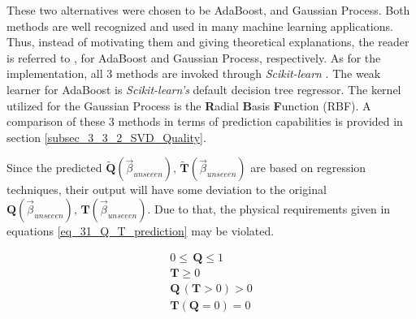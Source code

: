 These two alternatives were chosen to be AdaBoost, and Gaussian Process.
Both methods are well recognized and used in many machine learning applications.
Thus, instead of motivating them and giving theoretical explanations, the reader is referred to \cite{Adaboost}, \cite{Rasmussen2004,bishop2006pattern} for AdaBoost and Gaussian Process, respectively. 
As for the implementation, all 3 methods are invoked through \emph{Scikit-learn} \cite{scikit-learn}.
The weak learner for AdaBoost is  \emph{Scikit-learn's} default decision tree regressor.
The kernel utilized for the Gaussian Process is the \textbf{R}adial \textbf{B}asis \textbf{F}unction (RBF). A comparison of these 3 methods in terms of prediction capabilities is provided in section \ref{subsec_3_3_2_SVD_Quality}.\newline

Since the predicted $\bm{\tilde{Q}}(\vec{\beta}_{unseeen}) ,\, \bm{\tilde{T}}(\vec{\beta}_{unseeen})$ are based on regression techniques, their output will have some deviation to the original $\bm{Q}(\vec{\beta}_{unseeen}) ,\, \bm{T}(\vec{\beta}_{unseeen})$. 
Due to that, the physical requirements given in equations \eqref{eq_31_Q_T_prediction} may be violated. \newline

\begin{equation}
    \begin{aligned}
        0 \leq  \,  \bm Q \leq 1\\
        \bm T \geq 0 \\
        \bm Q \,(\bm T > 0) > 0 \\
        \bm T(\bm Q = 0) = 0 
    \end{aligned}
    \label{eq_31_Q_T_prediction}
\end{equation}

